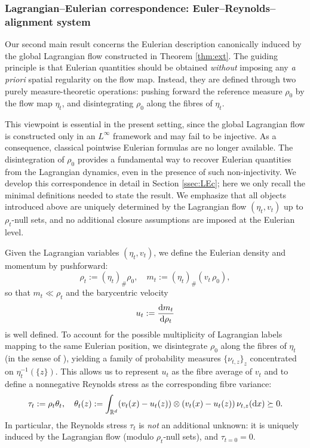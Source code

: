\documentclass[10pt,reqno]{amsart}
\numberwithin{equation}{section}
\newcommand{\R}{\mathbb R}
\newcommand{\intr}{\int_{\R^d}}
\newcommand{\rd}{\textnormal{d}}
\newcommand{\dx}{\textnormal{d}x}
\begin{document}
 


                      




 \subsubsection{Lagrangian--Eulerian correspondence: Euler--Reynolds--alignment system}\label{ssec:ERA}
 
Our second main result concerns the Eulerian description canonically induced by the global Lagrangian flow constructed in Theorem \ref{thm:ext}.  The guiding principle is that Eulerian
quantities should be obtained \emph{without} imposing any \emph{a priori} spatial regularity on the flow map.  Instead, they are defined through two purely measure-theoretic operations: pushing forward the reference measure $\rho_0$ by the flow map $\eta_t$, and disintegrating $\rho_0$ along the fibres of $\eta_t$.

This viewpoint is essential in the present setting, since the global Lagrangian flow is constructed only in an $L^\infty$ framework and may fail to be injective. As a consequence, classical pointwise Eulerian formulas are no longer available. The disintegration of $\rho_0$ provides a fundamental way to recover Eulerian quantities from the Lagrangian dynamics, even in the presence of such non-injectivity. We develop this correspondence in detail in Section \ref{ssec:LEc}; here we only recall the minimal definitions needed to state the result. We emphasize that all objects introduced above are uniquely determined by the Lagrangian flow $(\eta_t,v_t)$ up to $\rho_t$-null sets, and no additional closure assumptions are imposed at the Eulerian level.

Given the Lagrangian variables $(\eta_t,v_t)$, we define the Eulerian density and momentum by pushforward:
\[
\rho_t := (\eta_t)_\#\rho_0, \quad m_t := (\eta_t)_\#(v_t\,\rho_0),
\]
so that $m_t\ll \rho_t$ and the barycentric velocity
\[
u_t := \frac{\rd m_t}{\rd\rho_t}
\]
is well defined. To account for the possible multiplicity of Lagrangian labels mapping to the same Eulerian position, we disintegrate $\rho_0$ along the fibres of $\eta_t$ (in the sense of \cite[Theorem 5.3.1]{AGS08}), yielding a family of probability measures $\{\nu_{t,z}\}_{z}$ concentrated on $\eta_t^{-1}(\{z\})$.  This allows us to represent $u_t$ as the fibre average of $v_t$ and to define a nonnegative Reynolds stress as the corresponding fibre variance:
\[
\tau_t := \rho_t \theta_t, \quad \theta_t(z):=\intr (v_t(x)-u_t(z))\otimes(v_t(x)-u_t(z))\,\nu_{t,z}(\dx) \succeq 0.
\]
In particular, the Reynolds stress $\tau_t$ is \emph{not} an additional unknown: it is uniquely induced by the Lagrangian flow (modulo $\rho_t$-null sets), and $\tau_{t=0}=0$.
\end{document}
